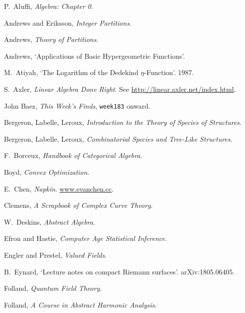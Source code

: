 \begin{thebibliography}{}

P.\ Aluffi, \emph{Algebra: Chapter 0}.

Andrews and Eriksson, \emph{Integer Partitions}.

Andrews, \emph{Theory of Partitions}.

Andrews, `Applications of Basic Hypergeometric Functions'.

M.\ Atiyah, `The Logarithm of the Dedekind $\eta$-Function'. 1987.

S.\ Axler, \emph{Linear Algebra Done Right}. See \url{http://linear.axler.net/index.html}.

John Baez, \emph{This Week's Finds}, \texttt{week183} onward.

Bergeron, Labelle, Leroux, \emph{Introduction to the Theory of Species of Structures}.

Bergeron, Labelle, Leroux, \emph{Combinatorial Species and Tree-Like Structures}. 

F.\ Borceux, \emph{Handbook of Categorical Algebra}.

Boyd, \emph{Convex Optimization}.

E.\ Chen, \emph{Napkin}. \url{www.evanchen.cc}.

Clemens, \emph{A Scrapbook of Complex Curve Theory}.

W.\ Deskins, \emph{Abstract Algebra}.

Efron and Hastie, \emph{Computer Age Statistical Inference}.

Engler and Prestel, \emph{Valued Fields}.

B.\ Eynard, `Lecture notes on compact Riemann surfaces'. arXiv:1805.06405.

Folland, \emph{Quantum Field Theory}.

Folland, \emph{A Course in Abstract Harmonic Analysis}.


\end{thebibliography}
